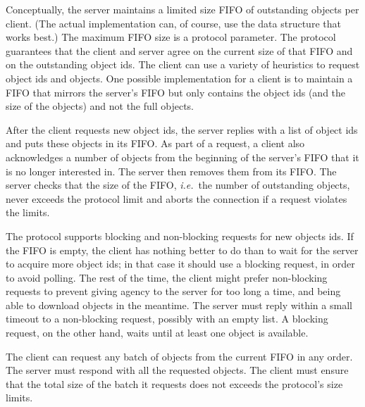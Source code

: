 Conceptually, the server maintains a limited size FIFO of outstanding objects
per client. (The actual implementation can, of course, use the data structure
that works best.) The maximum FIFO size is a protocol parameter. The protocol
guarantees that the client and server agree on the current size of that FIFO and
on the outstanding object ids. The client can use a variety of heuristics to
request object ids and objects. One possible implementation for a client is to
maintain a FIFO that mirrors the server's FIFO but only contains the object ids
(and the size of the objects) and not the full objects.

After the client requests new object ids, the server replies with a list of
object ids and puts these objects in its FIFO. As part of a request, a client
also acknowledges a number of objects from the beginning of the server's FIFO
that it is no longer interested in. The server then removes them from its FIFO.
The server checks that the size of the FIFO, {\em i.e.}\ the number of
outstanding objects, never exceeds the protocol limit and aborts the connection
if a request violates the limits.%
%

The protocol supports blocking and non-blocking requests for new objects ids. If
the FIFO is empty, the client has nothing better to do than to wait for the
server to acquire more object ids; in that case it should use a blocking
request, in order to avoid polling. The rest of the time, the client might
prefer non-blocking requests to prevent giving agency to the server for too long
a time, and being able to download objects in the meantime. The server must
reply within a small timeout to a non-blocking request, possibly with an empty
list. A blocking request, on the other hand, waits until at least one object is
available.

The client can request any batch of objects from the current FIFO in any order.
The server must respond with all the requested objects.%
%
%
The client must ensure that the total size of the batch it requests does not
exceeds the protocol's size limits.


